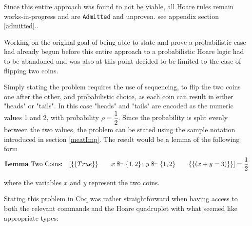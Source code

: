 
Since this entire approach was found to not be viable, all Hoare rules remain works-in-progress and are \texttt{Admitted} and unproven. see appendix section \ref{admitted}.. 

\label{meatApp1Coins}
Working on the original goal of being able to state and prove a probabilistic case had already begun before this entire approach to a probabilistic Hoare logic had to be abandoned and was also at this point decided to be limited to the case of flipping two coins. 

Simply stating the problem requires the use of sequencing, to flip the two coins one after the other, and probabilistic choice, as each coin can result in either "heads" or "tails". In this case "heads" and "tails" are encoded as the numeric values 1 and 2, with probability $\rho = \dfrac{1}{2}$. Since the probability is split evenly between the two values, the problem can be stated using the sample notation introduced in section \ref{meatImp}. The result would be a lemma of the following form 
$$\text{\textbf{Lemma} Two Coins:}\quad [\{\{ True \}\}\qquad x\; \$\!\!\! =\{1, 2\};\; y\; \$\!\!\! =\{1, 2\}\qquad \{\{(x + y = 3) \}\}]= \dfrac{1}{2} $$


where the variables $x$ and $y$ represent the two coins.

Stating this problem in Coq was rather straightforward when having access to both the relevant commands and the Hoare quadruplet with what seemed like appropriate types: 

